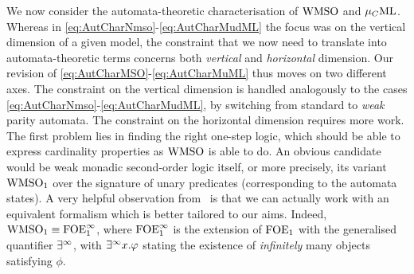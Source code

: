 We now consider the automata-theoretic characterisation of $\mathrm{WMSO}$ and $\mu_{C}\mathrm{ML}$.
Whereas in \eqref{eq:AutCharNmso}-\eqref{eq:AutCharMudML} the focus was on the 
vertical dimension of a given model, the constraint that we now need to 
translate into automata-theoretic terms concerns both \emph{vertical} and 
\emph{horizontal} dimension. 
Our revision of \eqref{eq:AutCharMSO}-\eqref{eq:AutCharMuML} thus moves on two
different axes. 
The constraint on the vertical dimension is handled analogously to the cases 
\eqref{eq:AutCharNmso}-\eqref{eq:AutCharMudML}, by switching from standard to
\emph{weak} parity automata. 
The constraint on the horizontal dimension requires more work. 
The first problem lies in finding the right one-step logic, which should be able
to express cardinality properties as $\mathrm{WMSO}$ is able to do. 
An obvious candidate would be weak monadic second-order logic itself, or more
precisely, its variant $\mathrm{WMSO}_1$ over the signature of unary predicates 
(corresponding to the automata states).
A very helpful observation from~\cite{vaananen77} is that we can actually work
with an equivalent formalism which is better tailored to our aims.
Indeed, $\mathrm{WMSO}_1 \equiv \mathrm{FOE}^{\infty}_1$, where $\mathrm{FOE}^{\infty}_1$ is the extension of $\mathrm{FOE}_1$ with
the generalised quantifier $\exists^\infty$, with $\exists^\infty x. \varphi$ stating the existence of 
\emph{infinitely} many objects satisfying $\phi$. 

